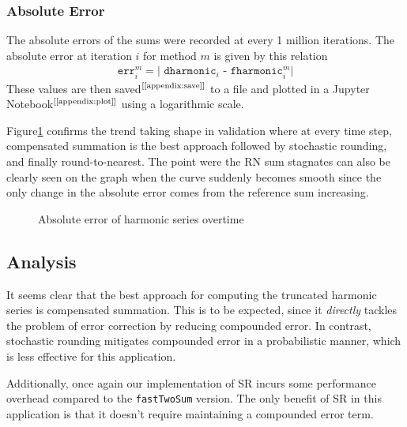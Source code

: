 \documentclass[a4paper]{article} %
\begin{document}
\begin{multicols}{2}
\subsubsection{Absolute Error}
The absolute errors of the sums were
recorded at every 1 million iterations. The absolute error
at iteration $i$ for method $m$ is given by this relation
\begin{align}
\texttt{
    err$_i^m = |$ dharmonic$_i$ - fharmonic$_i^m|$
}
\end{align}
These values are then saved$^\text{[\ref{appendix:save}]}$ to a file and plotted in a Jupyter Notebook$^\text{[\ref{appendix:plot}]}$ using a logarithmic scale.
\par
Figure\ref{fig:p3} confirms the trend taking shape in validation where at every time step, compensated summation is the best approach followed by stochastic rounding, and finally round-to-nearest. The point were the RN sum stagnates can also be clearly seen on the graph when the curve suddenly becomes smooth since the only change in the absolute error comes from the reference sum increasing.

\begin{figure}[H]
    
    \caption{Absolute error of harmonic series overtime}
    \label{fig:p3}
\end{figure}

\subsection{Analysis}
It seems clear that the best approach for computing the truncated harmonic series is compensated summation. This is to be expected, since it \textit{directly} tackles the problem of error correction by reducing compounded error. In contrast, stochastic rounding mitigates compounded error in a probabilistic manner, which is less effective for this application.
\par
Additionally, once again our implementation of SR incurs some performance overhead compared to the \verb|fastTwoSum| version. The only benefit of SR in this application is that it doesn't require maintaining a compounded error term.

\end{multicols}

\bigskip

\end{document}
